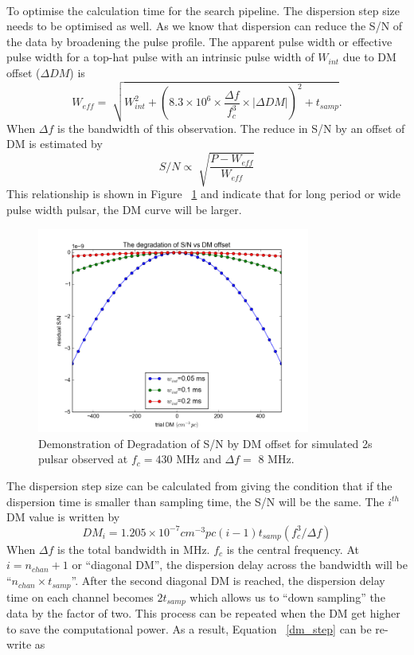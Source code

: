 \documentclass[thesis_msc.tex]{subfiles}
\begin{document}
        \paragraph{} To optimise the calculation time for the search pipeline. The dispersion step size needs to be optimised as well. As we know that dispersion can reduce the S/N of the data by broadening the pulse profile. The apparent pulse width or effective pulse width for a top-hat pulse with an intrinsic pulse width of $W_{int}$ due to DM offset ($\Delta DM$) is 
        \begin{equation}
        W_{eff}=\sqrt[]{W_{int}^2+(8.3 \times 10^6 \times \frac{\Delta f}{f_c^3} \times |\Delta DM|)^2+t_{samp}}.
        \end{equation}
        When $\Delta f$ is the bandwidth of this observation. The reduce in S/N by an offset of DM is estimated by 
        \begin{equation}
        S/N \propto \sqrt[]{\frac{P-W_{eff}}{W_{eff}}}
        \end{equation}
        This relationship is shown in Figure ~\ref{DMcurve} and indicate that for long period or wide pulse width pulsar, the DM curve will be larger.       
                 \begin{figure}[h]
\centering
\includegraphics[width=0.80\textwidth]{figures/DMcurve-title.png}
\caption{Demonstration of Degradation of S/N by DM offset for  simulated 2s pulsar observed at $f_c= 430$ MHz and $\Delta f=$ 8 MHz.}
\label{DMcurve}
\end{figure}
        The dispersion step size can be calculated from giving the condition that if the dispersion time is smaller than sampling time, the S/N will be the same. The $i^{th}$ DM value is written by 
        \begin{equation} \label{dm_step}
        DM_i=1.205\times10^{-7} cm^{-3} pc (i-1)t_{samp}(f_c^3/\Delta f)
        \end{equation}        
        When $\Delta f$ is the total bandwidth in MHz. $f_c$ is the central frequency. At $i=n_{chan}+1$ or ``diagonal DM'', the dispersion delay across the bandwidth will be ``$n_{chan} \times t_{samp}$''. After the second diagonal DM is reached, the dispersion delay time on each channel becomes $2 t_{samp}$ which allows us to ``down sampling'' the data by the factor of two. This process can be repeated when the DM get higher to save the computational power. As a result, Equation ~\ref{dm_step} can be re-write as 
        
\end{document}
